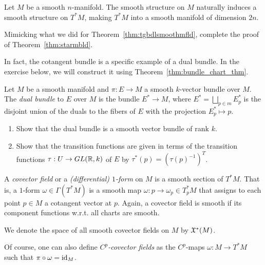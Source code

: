 \begin{theorem}\label{thm:starmbld}
  Let $M$ be a smooth $n$-manifold.
  The smooth structure on $M$ naturally induces a smooth structure on $T^*M$, making $T^*M$ into a smooth manifold of dimension $2n$.
\end{theorem}
\begin{exercise}\label{exe:prooftstarmbld}
  Mimicking what we did for Theorem~\ref{thm:tgbdlsmoothmfld}, complete the proof of Theorem~\ref{thm:starmbld}.
\end{exercise}

In fact, the cotangent bundle is a specific example of a dual bundle.
In the exercise below, we will construct it using Theorem~\ref{thm:bundle_chart_thm}.
\begin{exercise}
  Let $M$ be a smooth manifold and $\pi:E\to M$ a smooth $k$-vector bundle over $M$.
  The \emph{dual bundle} to $E$ over $M$ is the bundle $E^* \to M$, where $E^* = \bigsqcup_{p\in m} E_p^*$ is the disjoint union of the duals to the fibers of $E$ with the projection $E_p^* \mapsto p$.
  \begin{enumerate}
    \item Show that the dual bundle is a smooth vector bundle of rank $k$.
    \item Show that the transition functions are given in terms of the transition functions $\tau : U\to GL(\mathbb{R},k)$ of $E$ by $\tau^*(p) = (\tau(p)^{-1})^T$.
  \end{enumerate}
\end{exercise}

\begin{definition}\label{def:covfield}
  A \emph{covector field} or a \emph{(differential) $1$-form} on $M$ is a smooth section of $T^*M$.
  That is, a $1$-form $\omega\in\Gamma(T^*M)$ is a smooth map $\omega: p \to \omega_p \in T_p^*M$ that assigns to each point $p\in M$ a cotangent vector at $p$.
  Again, a covector field is smooth if its component functions w.r.t. all charts are smooth.

  We denote the space of all smooth covector fields on $M$ by $\mathfrak{X}^*(M)$.

  Of course, one can also define \emph{$C^p$-covector fields} as the $C^p$-maps $\omega:M\to T^*M$ such that $\pi\circ\omega = \operatorname{id}_M$.
\end{definition}

